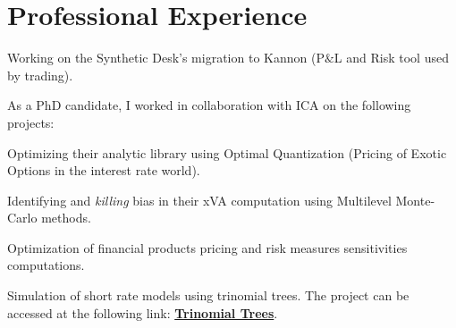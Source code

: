 \documentclass[]{deedy-resume-openfont}
\begin{document}
%
%
\lastupdated

%
%



\vspace{\topsep}

\section{Professional Experience}

Working on the Synthetic Desk's migration to Kannon (P$\&$L and Risk tool used by trading).

\sectionsep

As a PhD candidate, I worked in collaboration with ICA on the following projects:
\begin{tightemize}
	\item[\diamond] Optimizing their analytic library using Optimal Quantization (Pricing of Exotic Options in the interest rate world).
	\item[\diamond] Identifying and \textit{killing} bias in their xVA computation using Multilevel Monte-Carlo methods.
\end{tightemize}

\sectionsep

Optimization of financial products pricing and risk measures sensitivities computations.

\sectionsep

Simulation of short rate models using trinomial trees. The project can be accessed at the following link: \href{http://simulations.lpsm.paris/trinomial_trees/}{\bf Trinomial Trees}.
\end{document}
